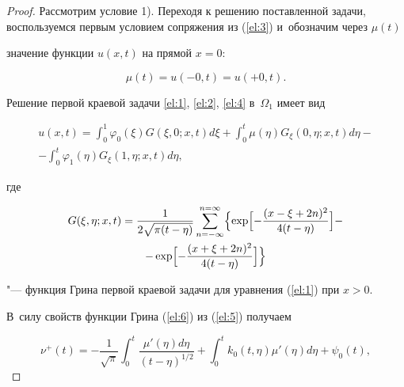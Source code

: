 \begin{proof}

Рассмотрим условие 1). Переходя к решению поставленной задачи, воспользуемся первым условием сопряжения из (\ref{el:3}) и~обозначим через $\mu(t)$

значение функции $u(x,t)$ на прямой $x=0$:

\begin{equation} \label{el:4}

\mu(t)=u(-0,t)=u(+0,t).

\end{equation}



Решение первой краевой задачи \eqref{el:1}, \eqref{el:2}, \eqref{el:4} в~$\Omega_1$ имеет вид

\begin{multline} \label{el:5}

u(x,t)=\int_0^1\varphi_0(\xi)G(\xi,0;x,t)d\xi+\int_0^t\mu(\eta)G_\xi(0,\eta;x,t)d\eta-

\\

-\int_0^t\varphi_1(\eta)G_\xi(1,\eta;x,t)d\eta,

\end{multline}

где

\begin{multline} \label{el:6}

G(\xi,\eta;x,t)=\frac{1}{2\sqrt{\pi(t-\eta)}}\sum\limits_{n=-\infty}^{n=\infty}\Bigl\{\exp\Bigl[-\frac{(x-\xi+2n)^2}{4(t-\eta)}\Bigr]-

\\

-\exp\Bigl[-\frac{(x+\xi+2n)^2}{4(t-\eta)}\Bigr]\Bigr\}

\end{multline}

"--- функция Грина первой краевой задачи для уравнения (\ref{el:1}) при $x>0$.

В~силу свойств функции Грина (\ref{el:6}) из (\ref{el:5}) получаем \cite{eleevbalk:bib:Eleev}

\begin{equation}\label{el:7}

\nu^+(t)=-\frac{1}{\sqrt{\pi}}\int_0^t\frac{\mu'(\eta)d\eta}{(t-\eta)^{1/2}}+\int_0^tk_0(t,\eta)

\mu'(\eta)d\eta+\psi_0(t),

\end{equation}


\end{proof}
